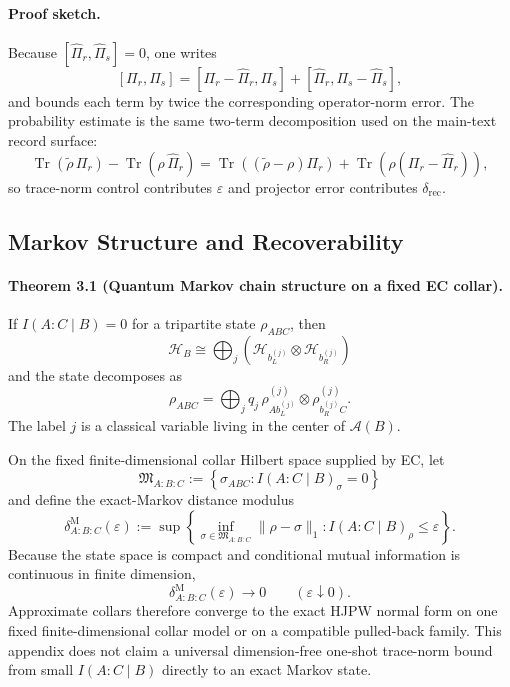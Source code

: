 \paragraph{\textbf{Proof sketch.}}
Because \([\widehat\Pi_r,\widehat\Pi_s]=0\), one writes
\[
[\Pi_r,\Pi_s]
=
[\Pi_r-\widehat\Pi_r,\Pi_s]
+
[\widehat\Pi_r,\Pi_s-\widehat\Pi_s],
\]
and bounds each term by twice the corresponding operator-norm error. The probability estimate is
the same two-term decomposition used on the main-text record surface:
\[
\operatorname{Tr}(\widetilde\rho\,\Pi_r)-\operatorname{Tr}(\rho\,\widehat\Pi_r)
=
\operatorname{Tr}((\widetilde\rho-\rho)\Pi_r)
+
\operatorname{Tr}(\rho(\Pi_r-\widehat\Pi_r)),
\]
so trace-norm control contributes \(\varepsilon\) and projector error contributes
\(\delta_{\mathrm{rec}}\).

\subsection{Markov Structure and Recoverability}

\paragraph{\textbf{Theorem 3.1 (Quantum Markov chain structure on a fixed EC collar).}}
If \(I(A:C\mid B)=0\) for a tripartite state \(\rho_{ABC}\), then
\[
\mathcal H_B
\cong
\bigoplus_j
\left(
\mathcal H_{b_L^{(j)}}\otimes \mathcal H_{b_R^{(j)}}
\right)
\]
and the state decomposes as
\[
\rho_{ABC}
=
\bigoplus_j
q_j\,
\rho^{(j)}_{A b_L^{(j)}}\otimes \rho^{(j)}_{b_R^{(j)} C}.
\]
The label \(j\) is a classical variable living in the center of \(\mathcal A(B)\).

On the fixed finite-dimensional collar Hilbert space supplied by EC, let
\[
\mathfrak M_{A:B:C}
:=
\left\{
\sigma_{ABC}: I(A:C\mid B)_\sigma=0
\right\}
\]
and define the exact-Markov distance modulus
\[
\delta^{\mathrm M}_{A:B:C}(\varepsilon)
:=
\sup\left\{
\inf_{\sigma\in\mathfrak M_{A:B:C}}\|\rho-\sigma\|_1:
I(A:C\mid B)_\rho\le\varepsilon
\right\}.
\]
Because the state space is compact and conditional mutual information is continuous in finite
dimension,
\[
\delta^{\mathrm M}_{A:B:C}(\varepsilon)\longrightarrow0
\qquad
(\varepsilon\downarrow0).
\]
Approximate collars therefore converge to the exact HJPW normal form on one fixed
finite-dimensional collar model or on a compatible pulled-back family. This appendix does not
claim a universal dimension-free one-shot trace-norm bound from small \(I(A:C\mid B)\) directly
to an exact Markov state.

